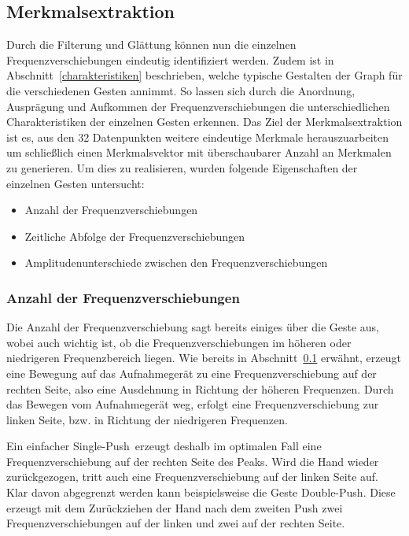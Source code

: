 \subsection{Merkmalsextraktion}
Durch die Filterung und Glättung können nun die einzelnen Frequenzverschiebungen eindeutig identifiziert werden. Zudem ist in Abschnitt~\ref{charakteristiken} beschrieben, welche typische Gestalten der Graph für die verschiedenen Gesten annimmt. So lassen sich durch die Anordnung, Ausprägung und Aufkommen der Frequenzverschiebungen die unterschiedlichen Charakteristiken der einzelnen Gesten erkennen. Das Ziel der Merkmalsextraktion ist es, aus den 32 Datenpunkten weitere eindeutige Merkmale herauszuarbeiten um schließlich einen Merkmalsvektor mit überschaubarer Anzahl an Merkmalen zu generieren. Um dies zu realisieren, wurden folgende Eigenschaften der einzelnen Gesten untersucht:

\begin{itemize} 
\item Anzahl der Frequenzverschiebungen
\item Zeitliche Abfolge der Frequenzverschiebungen
\item Amplitudenunterschiede zwischen den Frequenzverschiebungen
\end{itemize}

\subsubsection*{Anzahl der Frequenzverschiebungen}
Die Anzahl der Frequenzverschiebung sagt bereits einiges über die Geste aus, wobei auch wichtig ist, ob die Frequenzverschiebungen im höheren oder niedrigeren Frequenzbereich liegen. Wie bereits in Abschnitt~\ref{} erwähnt, erzeugt eine Bewegung auf das Aufnahmegerät zu eine Frequenzverschiebung auf der rechten Seite, also eine Ausdehnung in Richtung der höheren Frequenzen. Durch das Bewegen vom Aufnahmegerät weg, erfolgt eine Frequenzverschiebung zur linken Seite, bzw. in Richtung der niedrigeren Frequenzen. 

Ein einfacher \glqq Single-Push\grqq\ erzeugt deshalb im optimalen Fall eine Frequenzverschiebung auf der rechten Seite des Peaks. Wird die Hand wieder zurückgezogen, tritt auch eine Frequenzverschiebung auf der linken Seite auf. Klar davon abgegrenzt werden kann beispielsweise die Geste \glqq Double-Push\grqq. Diese erzeugt mit dem Zurückziehen der Hand nach dem zweiten Push zwei Frequenzverschiebungen auf der linken und zwei auf der rechten Seite.

